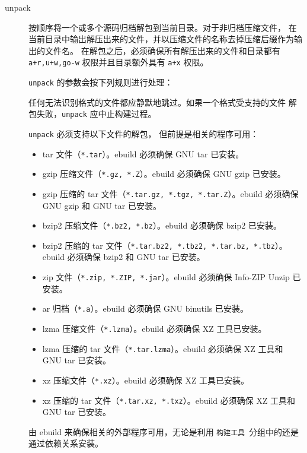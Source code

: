 \begin{description}
\item[unpack] 按顺序将一个或多个源码归档解包到当前目录。对于非归档压缩文件，
    在当前目录中输出解压出来的文件，并以压缩文件的名称去掉压缩后缀作为输出的文件名。
    在解包之后，必须确保所有解压出来的文件和目录都有 \texttt{a+r,u+w,go-w}
    权限并且目录额外具有 \texttt{a+x} 权限。

    \texttt{unpack} 的参数会按下列规则进行处理：

    任何无法识别格式的文件都应静默地跳过。如果一个格式受支持的文件
    解包失败，\texttt{unpack} 应中止构建过程。

    \texttt{unpack} 必须支持以下文件的解包，
    但前提是相关的程序可用：
    \begin{itemize}
    \item tar 文件（\texttt{*.tar}）。ebuild 必须确保 GNU tar 已安装。
    \item gzip 压缩文件（\texttt{*.gz, *.Z}）。ebuild 必须确保 GNU gzip 已安装。
    \item gzip 压缩的 tar 文件（\texttt{*.tar.gz, *.tgz, *.tar.Z}）。ebuild 必须确保
        GNU gzip 和 GNU tar 已安装。
    \item bzip2 压缩文件（\texttt{*.bz2, *.bz}）。ebuild 必须确保 bzip2 已安装。
    \item bzip2 压缩的 tar 文件（\texttt{*.tar.bz2, *.tbz2, *.tar.bz, *.tbz}）。ebuild 必须确保
        bzip2 和 GNU tar 已安装。
    \item zip 文件（\texttt{*.zip, *.ZIP, *.jar}）。ebuild 必须确保 Info-ZIP Unzip 已安装。
    \item ar 归档（\texttt{*.a}）。ebuild 必须确保 GNU binutils 已安装。
    \item lzma 压缩文件（\texttt{*.lzma}）。ebuild 必须确保 XZ 工具已安装。
    \item lzma 压缩的 tar 文件（\texttt{*.tar.lzma}）。ebuild 必须确保 XZ 工具和 GNU tar 已安装。
    \item xz 压缩文件（\texttt{*.xz}）。ebuild 必须确保 XZ 工具已安装。
    \item xz 压缩的 tar 文件（\texttt{*.tar.xz, *.txz}）。ebuild 必须确保 XZ 工具和 GNU tar 已安装。
    \end{itemize}
    由 ebuild 来确保相关的外部程序可用，无论是利用 \texttt{构建工具}\ 分组中的还是通过依赖关系安装。


\end{description}

